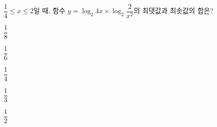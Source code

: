 $\dfrac{1}{4}\le x\le 2$일 때, 함수 $y=\log_2 4x\times\log_2 \dfrac{2}{x^2}$의 최댓값과 최솟값의 합은?
\begin{choices32}{\rule[-3ex]{0pt}{8ex}$\dfrac{1}{8}$}{\rule[-3ex]{0pt}{8ex}$\dfrac{1}{6}$}{\rule[-3ex]{0pt}{8ex}$\dfrac{1}{4}$}{\rule[-3ex]{0pt}{8ex}$\dfrac{1}{3}$}{\rule[-3ex]{0pt}{8ex}$\dfrac{1}{2}$}\end{choices32}
